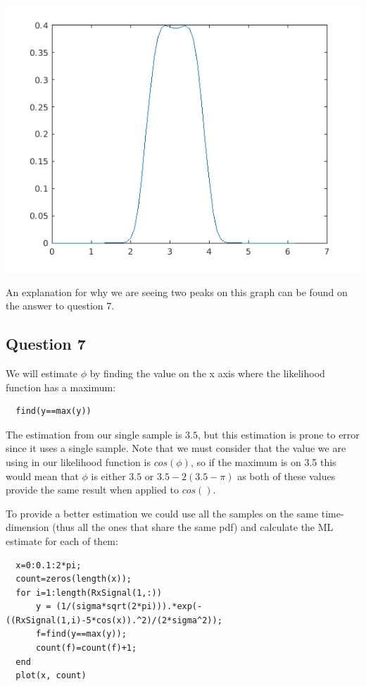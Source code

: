 \documentclass[conference,9pt]{IEEEtran}
\begin{document}
\includegraphics[scale=0.6]{6}

An explanation for why we are seeing two peaks on this graph can be found on the answer to question 7.

\subsection{Question 7}
We will estimate $\phi$ by finding the value on the x axis where the likelihood function has a maximum:
\begin{verbatim}
  find(y==max(y))
\end{verbatim}

The estimation from our single sample is $3.5$, but this estimation is prone to error since it uses a single sample. Note that we must consider that the value we are using in our likelihood function is $cos(\phi)$, so if the maximum is on 3.5 this would mean that $\phi$ is either $3.5$ or $3.5-2(3.5-\pi)$ as both of these values provide the same result when applied to $cos()$.

To provide a better estimation we could use all the samples on the same time-dimension (thus all the ones that share the same pdf) and calculate the ML estimate for each of them:

\begin{verbatim}
  x=0:0.1:2*pi;
  count=zeros(length(x));
  for i=1:length(RxSignal(1,:))
      y = (1/(sigma*sqrt(2*pi))).*exp(-((RxSignal(1,i)-5*cos(x)).^2)/(2*sigma^2));
      f=find(y==max(y));
      count(f)=count(f)+1;
  end
  plot(x, count)
\end{verbatim}
\end{document}
